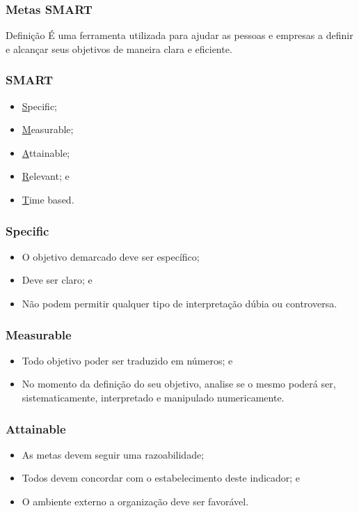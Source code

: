\documentclass[aspectratio=169]{beamer}
\begin{document}
\begin{frame}
	\frametitle{Metas SMART}

	\begin{block}{Defini\c cão}
		É uma ferramenta utilizada para ajudar as pessoas e empresas a definir e alcançar seus objetivos de maneira clara e eficiente.
	\end{block}
\end{frame}

\begin{frame}
	\frametitle{SMART}

	\begin{itemize}
		\item \underline{S}pecific;
		\item \underline{M}easurable;
		\item \underline{A}ttainable;
		\item \underline{R}elevant; e
		\item \underline{T}ime based.
	\end{itemize}
\end{frame}

\begin{frame}
	\frametitle{Specific}

	\begin{itemize}
		\item O objetivo demarcado deve ser específico;
		\item Deve ser claro; e
		\item Não podem permitir qualquer tipo de interpretação dúbia ou controversa.
	\end{itemize}
\end{frame}

\begin{frame}
	\frametitle{Measurable}

	\begin{itemize}
		\item Todo objetivo poder ser traduzido em números; e
		\item No momento da definição do seu objetivo, analise se o mesmo poderá ser, sistematicamente, interpretado e manipulado numericamente.
	\end{itemize}
\end{frame}

\begin{frame}
	\frametitle{Attainable}

	\begin{itemize}
		\item As metas devem seguir uma razoabilidade;
		\item Todos devem concordar com o estabelecimento deste indicador; e
		\item O ambiente externo a organiza\c cão deve ser favorável.
	\end{itemize}
\end{frame}
\end{document}
